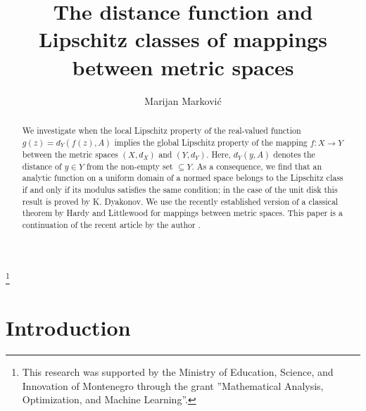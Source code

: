 \documentclass{amsart}
\theoremstyle{definition}
\numberwithin{equation}{section}
\begin{document}
\title[The distance function]{The distance function and Lipschitz classes of mappings between metric spaces}

\author{Marijan Markovi\'{c}}

\address{Faculty of Sciences and Mathematics\endgraf
University of Montenegro\endgraf
D\v{z}ord\v{z}a Va\v{s}ingtona bb Podgorica\endgraf
Montenegro\endgraf}

\begin{abstract}
We investigate when the local Lipschitz property of the real-valued function $g(z) = d_Y (f(z),A)$ implies the global
Lipschitz property of the mapping $f:X\to Y$ between the metric spaces $(X,d_X)$ and $(Y,d_Y)$. Here, $d_Y(y,A)$ denotes
the distance of $y\in Y$ from the non-empty set $\subseteq Y$. As a consequence, we find that an analytic function on a
uniform domain of a normed space belongs to the Lipschitz class if and only if its modulus satisfies the same condition;
in the case of the unit disk this result is proved by K. Dyakonov. We use the recently established version of a
classical theorem by Hardy and Littlewood for mappings between metric spaces. This paper is a continuation of the recent
article by the author \cite{MARKOVIC.JGA.2}.
\end{abstract}



\thanks{This research was supported by the Ministry of Education, Science, and Innovation of Montenegro
through the grant ''Mathematical Analysis, Optimization, and Machine Learning''.}

\maketitle

\section{Introduction}

\end{document}
